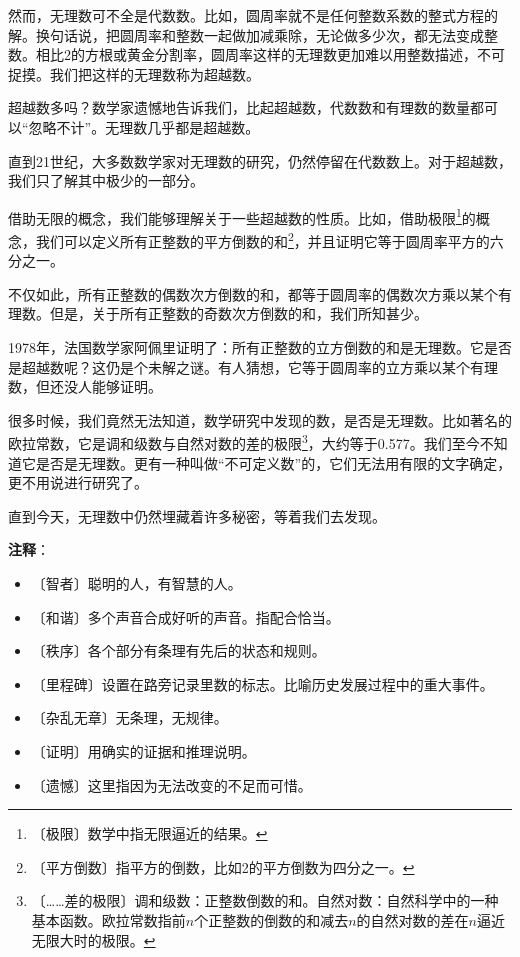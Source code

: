 \documentclass[12pt,UTF-8,openany]{ctexbook}
\begin{document}
\begin{large}
    然而，无理数可不全是代数数。比如，圆周率就不是任何整数系数的整式方程的解。换句话说，把圆周率和整数一起做加减乘除，无论做多少次，都无法变成整数。相比2的方根或黄金分割率，圆周率这样的无理数更加难以用整数描述，不可捉摸。我们把这样的无理数称为超越数。
    
    超越数多吗？数学家遗憾地告诉我们，比起超越数，代数数和有理数的数量都可以“忽略不计”。无理数几乎都是超越数。
    
    直到21世纪，大多数数学家对无理数的研究，仍然停留在代数数上。对于超越数，我们只了解其中极少的一部分。
    
    借助无限的概念，我们能够理解关于一些超越数的性质。比如，借助极限\footnote{〔极限〕数学中指无限逼近的结果。}的概念，我们可以定义所有正整数的平方倒数的和\footnote{〔平方倒数〕指平方的倒数，比如2的平方倒数为四分之一。}，并且证明它等于圆周率平方的六分之一。
    
    不仅如此，所有正整数的偶数次方倒数的和，都等于圆周率的偶数次方乘以某个有理数。但是，关于所有正整数的奇数次方倒数的和，我们所知甚少。
    
    1978年，法国数学家阿佩里证明了：所有正整数的立方倒数的和是无理数。它是否是超越数呢？这仍是个未解之谜。有人猜想，它等于圆周率的立方乘以某个有理数，但还没人能够证明。
    
    很多时候，我们竟然无法知道，数学研究中发现的数，是否是无理数。比如著名的欧拉常数，它是调和级数与自然对数的差的极限\footnote{〔……差的极限〕调和级数：正整数倒数的和。自然对数：自然科学中的一种基本函数。欧拉常数指前$n$个正整数的倒数的和减去$n$的自然对数的差在$n$逼近无限大时的极限。}，大约等于0.577。我们至今不知道它是否是无理数。更有一种叫做“不可定义数”的，它们无法用有限的文字确定，更不用说进行研究了。
    
    直到今天，无理数中仍然埋藏着许多秘密，等着我们去发现。
    
\end{large}


\newpage

\textbf{注释}：

\vspace{-1em}

\begin{itemize}
    \setlength\itemsep{-0.2em}
    \item 〔智者〕聪明的人，有智慧的人。
    \item 〔和谐〕多个声音合成好听的声音。指配合恰当。
    \item 〔秩序〕各个部分有条理有先后的状态和规则。
    \item 〔里程碑〕设置在路旁记录里数的标志。比喻历史发展过程中的重大事件。
    \item 〔杂乱无章〕无条理，无规律。
    \item 〔证明〕用确实的证据和推理说明。
    \item 〔遗憾〕这里指因为无法改变的不足而可惜。
\end{itemize}
\end{document}
